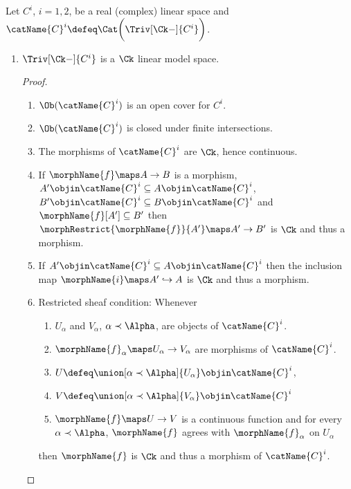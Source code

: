 \documentclass{article}
\begin{document}
\begin{lemma}
\label{lem:trivck}
Let $C^i$, $i=1,2$, be a real (complex) linear space and
$\catName{C}^i \defeq \Cat \biggl ( \Triv[\Ck-]{C^i} \biggr )$.

\begin{enumerate}
\item
$\Triv[\Ck-]{C^i}$ is a $\Ck$ linear model space.

\begin{proof}
\leavevmode
\begin{enumerate}
\item $\Ob(\catName{C}^i)$ is an open cover for $C^i$.

\item $\Ob(\catName{C}^i)$ is closed under finite intersections.

\item The morphisms of $\catName{C}^i$ are $\Ck$, hence continuous.

\item If $\morphName{f} \maps A \to B$ is a morphism,
$A' \objin \catName{C}^i \subseteq A \objin \catName{C}^i$,
$B' \objin \catName{C}^i \subseteq B \objin \catName{C}^i$
and $\morphName{f}[A'] \subseteq B'$ then
$\morphRestrict{\morphName{f}}{A'} \maps A' \to B'$ is $\Ck$ and thus a
morphism.

\item If $A' \objin \catName{C}^i \subseteq A \objin \catName{C}^i$
then the inclusion map $\morphName{i} \maps A' \hookrightarrow A$ is
$\Ck$ and thus a morphism.

\item Restricted sheaf condition: Whenever
\begin{enumerate}
\item $U_\alpha$ and $V_\alpha$, $\alpha \prec \Alpha$,
are objects of $\catName{C}^i$.

\item $\morphName{f}_\alpha \maps U_\alpha \to V_\alpha$ are morphisms of
$\catName{C}^i$.

\item
$U \defeq \union[\alpha \prec \Alpha]{U_\alpha} \objin \catName{C}^i$,

\item
$V \defeq \union[\alpha \prec \Alpha]{V_\alpha} \objin \catName{C}^i$

\item
$\morphName{f} \maps U \to V$ is a continuous function and
for every $\alpha \prec \Alpha$,
$\morphName{f}$ agrees with $\morphName{f}_\alpha$ on $U_\alpha$
\end{enumerate}
then $\morphName{f}$ is $\Ck$ and thus a morphism of $\catName{C}^i$.
\end{enumerate}
\end{proof}


\end{enumerate}
\end{lemma}
\end{document}
